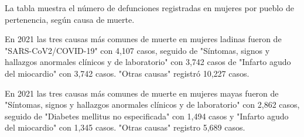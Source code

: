 \justifying La tabla muestra el número de defunciones registradas en mujeres por pueblo de pertenencia, según causa de muerte. 

En 2021 las tres causas más comunes de muerte en mujeres ladinas fueron de "SARS-CoV2/COVID-19" con 4,107 casos, seguido de "Síntomas, signos y hallazgos anormales clínicos y de laboratorio" con 3,742 casos de "Infarto agudo del miocardio" con 3,742 casos. "Otras causas" registró 10,227 casos. 

En 2021 las tres causas más comunes de muerte en mujeres mayas fueron de "Síntomas, signos y hallazgos anormales clínicos y de laboratorio" con 2,862 casos, seguido de "Diabetes mellitus no especificada" con 1,494 casos y "Infarto agudo del miocardio" con 1,345 casos. "Otras causas" registro 5,689 casos.